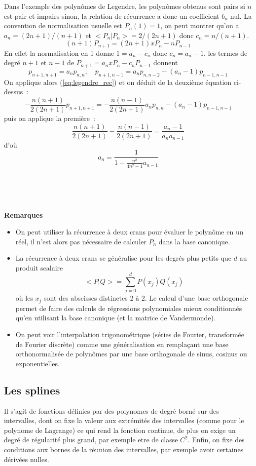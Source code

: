 \documentclass[a4paper,11pt]{article}
\begin{document}
\begin{giacjshere}
Dans l'exemple des polyn\^omes de Legendre, les polyn\^omes obtenus
sont pairs si $n$ est pair et impairs sinon, la relation de 
r\'ecurrence a donc un coefficient $b_n$ nul. La convention
de normalisation usuelle est $P_n(1)=1$, on peut montrer qu'on a
$a_n=(2n+1)/(n+1)$ et $<P_n|P_n>=2/(2n+1)$ 
donc $c_n=n/(n+1)$.
$$ (n+1)P_{n+1}=(2n+1)xP_n-nP_{n-1}$$
En effet la normalisation en 1 donne $1=a_n-c_n$ donc $c_n=a_n-1$,
les termes de degr\'e $n+1$ et $n-1$ de $P_{n+1}=a_nxP_n-c_nP_{n-1}$ donnent
$$ p_{n+1,n+1}=a_np_{n,n}, \quad p_{n+1,n-1}=a_n
p_{n,n-2}-(a_n-1)p_{n-1,n-1}$$
On applique alors (\ref{eq:legendre_rec}) et on d\'eduit de la
deuxi\`eme \'equation ci-dessus~:
$$ -\frac{n(n+1)}{2(2n+1)} p_{n+1,n+1}= -\frac{n(n-1)}{2(2n+1)} a_n
p_{n,n}-(a_n-1)p_{n-1,n-1}$$
puis on applique la premi\`ere~:
$$ \frac{n(n+1)}{2(2n+1)} -
\frac{n(n-1)}{2(2n+1)}=\frac{a_n-1}{a_na_{n-1}}$$
d'o\`u 
$$ a_n=\frac{1}{1-\frac{n^2}{4n^2-1} a_{n-1}}$$



\\
\\
\\

{\bf Remarques}
\begin{itemize}
\item On peut utiliser la r\'ecurrence \`a deux crans pour \'evaluer
le polyn\^ome en un r\'eel, il n'est alors pas n\'ecessaire
de calculer $P_n$ dans la base canonique.
\item La r\'ecurrence \`a deux crans se g\'en\'eralise pour les degr\'es
plus petits que $d$ au produit scalaire
$$ <P|Q>=\sum_{j=0}^d P(x_j) Q(x_j) $$
o\`u les $x_j$ sont des abscisses distinctes 2 \`a 2. Le calcul
d'une base orthogonale permet de
faire des calculs de r\'egressions polynomiales mieux conditionn\'es
qu'en utilisant la base canonique (et la matrice de Vandermonde).
\item
On peut voir l'interpolation trigonom\'etrique (s\'eries de Fourier,
transform\'ee de Fourier discr\`ete) comme une
g\'en\'eralisation en rempla\c{c}ant une base orthonormalis\'ee
de polyn\^omes par une base orthogonale de sinus, cosinus
ou exponentielles.
\end{itemize}

\subsection{Les splines}
Il s'agit de fonctions définies par des polynomes de degré borné
sur des intervalles, dont on fixe la valeur
aux extrémités des intervalles (comme pour le polynome de Lagrange)
ce qui rend la fonction continue, de plus on exige un
degré de régularité plus grand, par exemple etre de classe $C^2$.
Enfin, on fixe des conditions aux bornes de la réunion des 
intervalles, par exemple avoir certaines dérivées nulles. 


\end{giacjshere}
\end{document}
